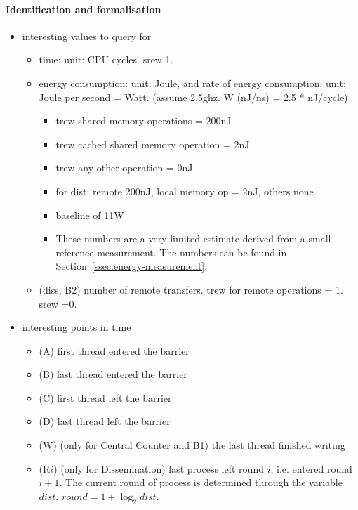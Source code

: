 \documentclass[a4paper, 10pt]{article}
\begin{document}
\paragraph{Identification and formalisation}
\label{ssssec:analysis-modelchecking-quantitative-properties-identification}
\begin{itemize}
	\item interesting values to query for
		\begin{itemize}
			\item time: unit: CPU cycles. srew 1.
			\item energy consumption: unit: Joule, and rate of energy consumption: unit: Joule per second = Watt. (assume 2.5ghz. W (nJ/ns) = 2.5 * nJ/cycle)
				\begin{itemize}
					\item trew shared memory operations = 200nJ
					\item trew cached shared memory operation = 2nJ
					\item trew any other operation = 0nJ
					\item for dist: remote 200nJ, local memory op = 2nJ, others none
					\item baseline of 11W
					\item These numbers are a very limited estimate derived from a small reference measurement. The numbers can be found in Section~\ref{ssec:energy-measurement}.
				\end{itemize}
			\item (diss, B2) number of remote transfers. trew for remote operations = 1. srew =0.
		\end{itemize}
	\item interesting points in time
		\begin{itemize}
			\item (A) first thread entered the barrier
			\item (B) last thread entered the barrier
			\item (C) first thread left the barrier
			\item (D) last thread left the barrier
			\item (W) (only for Central Counter and B1) the last thread finished writing
			\item (R$i$) (only for Dissemination) last process left round $i$, i.e. entered round $i+1$. The current round of process is determined through the variable $\mathit{dist}$. $\mathit{round} = 1 + \log_2 \mathit{dist}$.
		\end{itemize}

\end{itemize}
\end{document}
